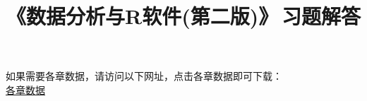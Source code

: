 \documentclass[UTF8]{ctexart}
\title{\Large\heiti 《数据分析与R软件(第二版)》\,习题解答\vspace{-3em}}
\date{}
\begin{document}
    \maketitle
    \begin{center}
      如果需要各章数据，请访问以下网址，点击各章数据即可下载：\\
      \href{http://pan-yz.chaoxing.com/pcNote/openFolder?resid=631246748661153792&puid=103416764}{各章数据}
    \end{center}
    \tableofcontents
    \clearpage
    
    
    
    
    
    
    
    
    
\end{document}
